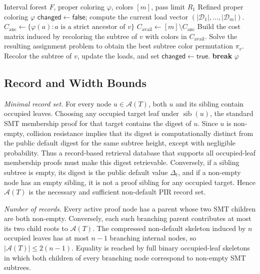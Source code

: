 \begin{algorithm}[H]
\caption{\ActiveBalance{} by subtree recoloring}
\label{alg:app_activebalance}
\footnotesize
\begin{algorithmic}[1]
\Require Interval forest \(F\), proper coloring \(\varphi\), colors \([m]\), pass limit \(R_1\)
\Ensure Refined proper coloring \(\varphi\)
    \State \(\mathsf{changed}\gets\mathsf{false}\); compute the current load vector \((|\mathcal{D}_1|,\ldots,|\mathcal{D}_m|)\).
        \State \(C_{\mathrm{anc}}\gets\{\varphi(a):a\text{ is a strict ancestor of }v\}\)
        \State \(C_{\mathrm{avail}}\gets [m]\setminus C_{\mathrm{anc}}\)
        \State Build the cost matrix induced by recoloring the subtree of \(v\) with colors in \(C_{\mathrm{avail}}\).
        \State Solve the resulting assignment problem to obtain the best subtree color permutation \(\pi_v\).
            \State Recolor the subtree of \(v\), update the loads, and set \(\mathsf{changed}\gets\mathsf{true}\).
        \EndIf
    \EndFor
        \State \textbf{break}
    \EndIf
\EndFor
\State \Return \(\varphi\)
\end{algorithmic}
\end{algorithm}

\subsection{Record and Width Bounds}

\emph{Minimal record set.}
For every node \(u\in\mathcal{A}(T)\), both \(u\) and its sibling contain occupied leaves. Choosing any occupied target leaf under \(\operatorname{sib}(u)\), the standard SMT membership proof for that target contains the digest of \(u\). Since \(u\) is non-empty, collision resistance implies that its digest is computationally distinct from the public default digest for the same subtree height, except with negligible probability. Thus a record-based retrieval database that supports all occupied-leaf membership proofs must make this digest retrievable. Conversely, if a sibling subtree is empty, its digest is the public default value \(\Delta_t\), and if a non-empty node has an empty sibling, it is not a proof sibling for any occupied target. Hence \(\mathcal{A}(T)\) is the necessary and sufficient non-default PIR record set.

\emph{Number of records.}
Every active proof node has a parent whose two SMT children are both non-empty. Conversely, each such branching parent contributes at most its two child roots to \(\mathcal{A}(T)\). The compressed non-default skeleton induced by \(n\) occupied leaves has at most \(n-1\) branching internal nodes, so \(|\mathcal{A}(T)|\le 2(n-1)\). Equality is reached by full binary occupied-leaf skeletons in which both children of every branching node correspond to non-empty SMT subtrees.

